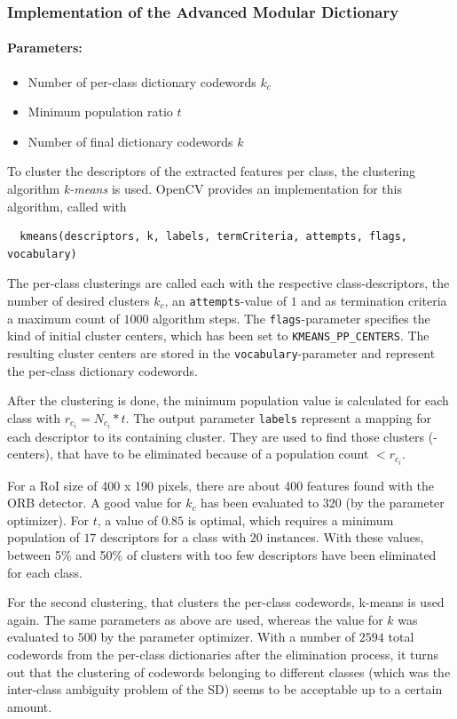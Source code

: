 \subsubsection{Implementation of the Advanced Modular Dictionary}
\paragraph{Parameters:}
\begin{itemize}
  \item Number of per-class dictionary codewords $k_c$
  \item Minimum population ratio $t$
  \item Number of final dictionary codewords $k$
\end{itemize}
To cluster the descriptors of the extracted features per class, the clustering algorithm \emph{k-means} is used. OpenCV provides an implementation for this algorithm, called with
\begin{verbatim}
  kmeans(descriptors, k, labels, termCriteria, attempts, flags, vocabulary)
\end{verbatim}
The per-class clusterings are called each with the respective class-descriptors, the number of desired clusters $k_c$, an \texttt{attempts}-value of $1$ and as termination criteria a maximum count of $1000$ algorithm steps. The \texttt{flags}-parameter specifies the kind of initial cluster centers, which has been set to \texttt{KMEANS\_PP\_CENTERS}. The resulting cluster centers are stored in the \texttt{vocabulary}-parameter and represent the per-class dictionary codewords.

After the clustering is done, the minimum population value is calculated for each class with $r_{c_i} = N_{c_i} * t$. The output parameter \texttt{labels} represent a mapping for each descriptor to its containing cluster. They are used to find those clusters (-centers), that have to be eliminated because of a population count $< r_{c_i}$.

For a RoI size of 400 x 190 pixels, there are about 400 features found with the ORB detector. A good value for $k_c$ has been evaluated to $320$ (by the parameter optimizer). For $t$, a value of $0.85$ is optimal, which requires a minimum population of $17$ descriptors for a class with $20$ instances. With these values, between 5\% and 50\% of clusters with too few descriptors have been eliminated for each class.

For the second clustering, that clusters the per-class codewords, k-means is used again. The same parameters as above are used, whereas the value for $k$ was evaluated to $500$ by the parameter optimizer. With a number of $2594$ total codewords from the per-class dictionaries after the elimination process, it turns out that the clustering of codewords belonging to different classes (which was the inter-class ambiguity problem of the SD) seems to be acceptable up to a certain amount.

